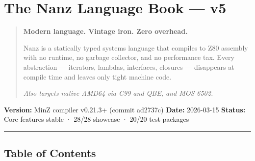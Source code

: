 \documentclass[
  11pt,
]{article}
\author{}
\date{}
\begin{document}
\hypertarget{the-nanz-language-book-v5}{%
\section{The Nanz Language Book ---
v5}\label{the-nanz-language-book-v5}}

\begin{quote}
\textbf{Modern language. Vintage iron. Zero overhead.}

Nanz is a statically typed systems language that compiles to Z80
assembly with no runtime, no garbage collector, and no performance tax.
Every abstraction --- iterators, lambdas, interfaces, closures ---
disappears at compile time and leaves only tight machine code.

\emph{Also targets native AMD64 via C99 and QBE, and MOS 6502.}
\end{quote}

\textbf{Version:} MinZ compiler v0.21.3+ (commit ad2737c) \textbf{Date:}
2026-03-15 \textbf{Status:} Core features stable · 28/28 showcase ·
20/20 test packages

\begin{center}\rule{0.5\linewidth}{0.5pt}\end{center}

\hypertarget{table-of-contents}{%
\subsection{Table of Contents}\label{table-of-contents}}
\end{document}
